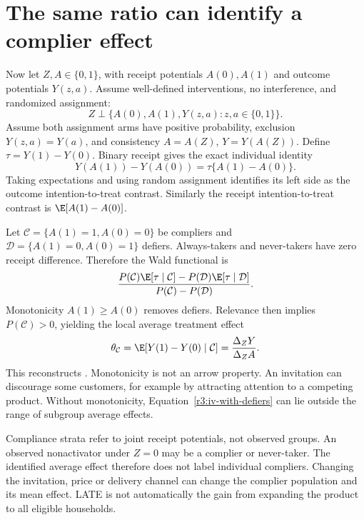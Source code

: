 \section{The same ratio can identify a complier effect}
\label{r3:late}
Now let $Z,A\in\{0,1\}$, with receipt potentials $A(0),A(1)$ and
outcome potentials $Y(z,a)$. Assume well-defined interventions, no
interference, and randomized assignment:
\[
 Z\perp\{A(0),A(1),Y(z,a):z,a\in\{0,1\}\}.
\]
Assume both assignment arms have positive probability, exclusion
$Y(z,a)=Y(a)$, and consistency
$A=A(Z)$, $Y=Y(A(Z))$. Define $\tau=Y(1)-Y(0)$.
Binary receipt gives the exact individual identity
\begin{equation}
 Y(A(1))-Y(A(0))=\tau\{A(1)-A(0)\}.
 \label{r3:compliance-identity}
\end{equation}
Taking expectations and using random assignment identifies its left side
as the outcome intention-to-treat contrast. Similarly the receipt
intention-to-treat contrast is $\E[A(1)-A(0)]$.

Let $\mathcal C=\{A(1)=1,A(0)=0\}$ be compliers and
$\mathcal D=\{A(1)=0,A(0)=1\}$ defiers. Always-takers and never-takers
have zero receipt difference. Therefore the Wald functional is
\begin{equation}
 \frac{P(\mathcal C)\E[\tau\mid\mathcal C]
             -P(\mathcal D)\E[\tau\mid\mathcal D]}
       {P(\mathcal C)-P(\mathcal D)}.
 \label{r3:iv-with-defiers}
\end{equation}
Monotonicity $A(1)\ge A(0)$ removes defiers. Relevance then implies
$P(\mathcal C)>0$, yielding the local average treatment effect
\begin{equation}
 \theta_{\mathcal C}=\E[Y(1)-Y(0)\mid\mathcal C]
 =\frac{\Delta_Z Y}{\Delta_Z A}.
 \label{r3:late-result}
\end{equation}
This reconstructs \citet[Equation (9), Table 1 and Proposition 1]{angrist1996}.
Monotonicity is not an arrow property. An invitation can discourage some
customers, for example by attracting attention to a competing product.
Without monotonicity, Equation~\eqref{r3:iv-with-defiers} can lie outside
the range of subgroup average effects.

Compliance strata refer to joint receipt potentials, not observed groups.
An observed nonactivator under $Z=0$ may be a complier or never-taker.
The identified average effect therefore does not label individual
compliers. Changing the invitation, price or delivery channel can change
the complier population and its mean effect. LATE is not automatically
the gain from expanding the product to all eligible households.

